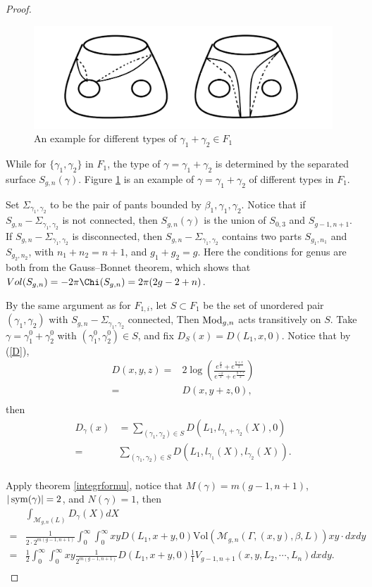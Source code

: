 \begin{proof}
\begin{figure}[h]
    \centering
    \includegraphics[width=3 in]{picture/gammatype.png}
    \caption{An example for different types of $\gamma_1+\gamma_2\in F_1$}
    \label{fig:gammatype}
\end{figure}

While for $\{\gamma_1,\gamma_2\}$ in $F_{1}$, the type of $\gamma=\gamma_1+\gamma_2$ is determined by the separated surface  $S_{g,n}(\gamma)$. Figure \ref{fig:gammatype} is an example of $\gamma=\gamma_1+\gamma_2$  of different types in $F_1$.
 
Set $\Sigma_{\gamma_1,\gamma_2}$ to be the pair of pants bounded by $\beta_1,\gamma_1,\gamma_2$.
Notice that if $S_{g,n}-\Sigma_{\gamma_1,\gamma_2}$ is not connected, then $S_{g,n}(\gamma)$ is the union of $S_{0,3}$ and $S_{g-1,n+1}$.  If $S_{g,n}-\Sigma_{\gamma_1,\gamma_2}$ is disconnected, then  $S_{g,n}-\Sigma_{\gamma_1,\gamma_2}$ contains two parts $S_{g_1,n_1}$ and $S_{g_2,n_2}$, with  $n_1+n_2=n+1$, and $g_1+g_2=g$. Here the conditions for genus are both  from the Gauss--Bonnet theorem, which shows that  $Vol(S_{g,n})=-2\pi\Chi(S_{g,n})=2\pi(2g-2+n)$.

 By the same argument as for $F_{1,i}$,  let $S\subset F_{1}$ be the set of unordered pair $(\gamma_1,\gamma_2)$ with $S_{g,n}-\Sigma_{\gamma_1,\gamma_2}$ connected, Then $\operatorname{Mod}_{g,n}$ acts transitively on $S$. Take $\gamma=\gamma^0_1+\gamma^0_2$ with $(\gamma_1^0,\gamma_2^0)\in S$, and fix $D_S(x)=D(L_1,x,0)$. Notice that by (\ref{D}),$$\begin{aligned}
D(x,y,z)=&2\log \left(\frac{e^{\frac{x}{2}}+e^{\frac{y+z}{2}}}{e^{\frac{-x}{2}}+e^{\frac{y+z}{2}}}\right)\\
=&D(x,y+z,0),\\
\end{aligned}$$
then $$\begin{aligned}
D_\gamma(x)&=\sum_{(\gamma_1,\gamma_2)\in S}D(L_1,l_{\gamma_1+\gamma_2}(X),0)\\
=&\sum_{(\gamma_1,\gamma_2)\in S}D(L_1,l_{\gamma_1}(X),l_{\gamma_2}(X)).\\
\end{aligned}$$

Apply theorem \ref{integrformu}, notice that $M(\gamma)=m(g-1,n+1)$, $|\operatorname{sym}(\gamma)|= 2$, and $N(\gamma)=1$, then 
$$
\begin{aligned}
&\int_{\mathscr{M}_{g,n}(L)}D_\gamma(X)dX\\
=&\frac{1}{2\cdot 2^{m(g-1,n+1)}}\int_0^\infty \int_0^\infty  xyD(L_1,x+y,0)  \mathrm{Vol}(\mathscr{M}_{g,n}(\Gamma,(x,y),\beta,L))xy\cdot dxdy\\
=&\frac{1}{2}\int_0^\infty\int_0^\infty xy  \frac{1}{2^{m(g-1,n+1)}}D(L_1,x+y,0)\frac{1}{1}V_{g-1,n+1}(x,y,L_2,\cdots,L_n)dxdy.\\
\end{aligned}
$$


\end{proof}
